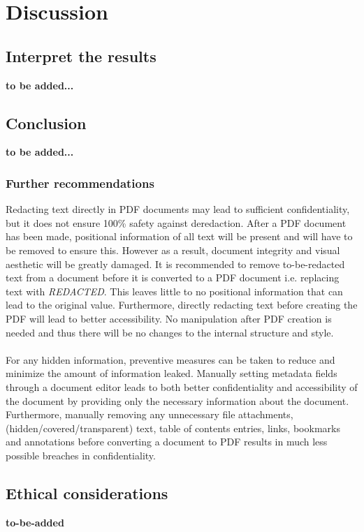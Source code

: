 \chapter{Discussion}

\section{Interpret the results}
\textbf{to be added...}

\section{Conclusion}
\textbf{to be added...}

\subsection{Further recommendations}
Redacting text directly in PDF documents may lead to sufficient confidentiality, but it does not ensure 100\% safety against deredaction. After a PDF document has been made, positional information of all text will be present and will have to be removed to ensure this. However as a result, document integrity and visual aesthetic will be greatly damaged. It is recommended to remove to-be-redacted text from a document before it is converted to a PDF document i.e. replacing text with \textit{REDACTED}. This leaves little to no positional information that can lead to the original value. Furthermore, directly redacting text before creating the PDF will lead to better accessibility. No manipulation after PDF creation is needed and thus there will be no changes to the internal structure and style. 
\\\\
For any hidden information, preventive measures can be taken to reduce and minimize the amount of information leaked. Manually setting metadata fields through a document editor leads to both better confidentiality and accessibility of the document by providing only the necessary information about the document. Furthermore, manually removing any unnecessary file attachments, (hidden/covered/transparent) text, table of contents entries, links, bookmarks and annotations before converting a document to PDF results in much less possible breaches in confidentiality.

\section{Ethical considerations}
\textbf{to-be-added}

